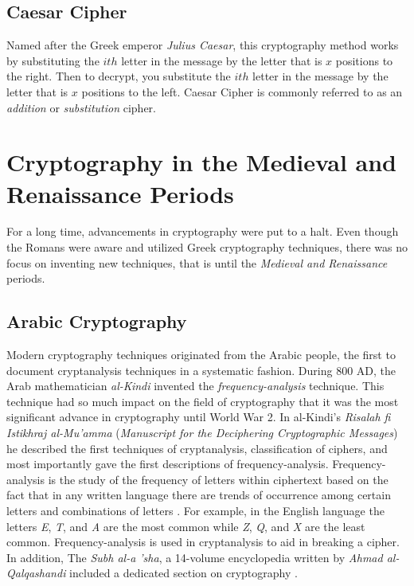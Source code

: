 \subsection{Caesar Cipher}

Named after the Greek emperor \textit{Julius Caesar}, this cryptography method works by substituting the $ith$ letter in the 
message by the letter that is $x$ positions to the right. Then to decrypt, you substitute the $ith$ letter in the message by 
the letter that is $x$ positions to the left. Caesar Cipher is commonly referred to as an \textit{addition} or \textit{substitution} 
cipher.

\section{Cryptography in the Medieval and Renaissance Periods}

For a long time, advancements in cryptography were put to a halt. Even though the Romans were aware and utilized Greek 
cryptography techniques, there was no focus on inventing new techniques, that is until the \textit{Medieval and Renaissance}
periods.

\subsection{Arabic Cryptography}

Modern cryptography techniques originated from the Arabic people, the first to document cryptanalysis techniques 
in a systematic fashion. During 800 AD, the Arab mathematician \textit{al-Kindi} invented the \textit{frequency-analysis} 
technique. This technique had so much impact on the field of cryptography that it was the most significant advance in
cryptography until World War 2. In al-Kindi's \textit{Risalah fi Istikhraj al-Mu'amma} 
(\textit{Manuscript for the Deciphering Cryptographic Messages}) he described the first techniques of cryptanalysis,
classification of ciphers, and most importantly gave the first descriptions of frequency-analysis.
Frequency-analysis is the study of the frequency of letters within ciphertext based on the fact that in any
written language there are trends of occurrence among certain letters and combinations of letters \cite{wiki:frequency_analysis}. For example, in the
English language the letters \textit{E}, \textit{T}, and \textit{A} are the most common while \textit{Z}, \textit{Q}, and \textit{X} are the least common. 
Frequency-analysis is used in cryptanalysis to aid in breaking a cipher. In addition, The \textit{Subh al-a 'sha}, a 14-volume encyclopedia written by 
\textit{Ahmad al-Qalqashandi} included a dedicated section on cryptography \cite{wiki:history_of_cryptography}.
 
